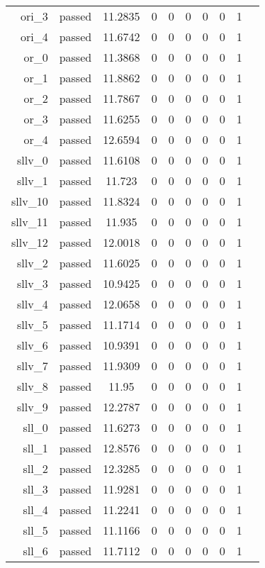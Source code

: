 \begin{longtable}{r|ccccccccc}
    ori\_3 & passed & 11.2835 & 0 & 0 & 0 & 0 & 0 & 1 \\
    ori\_4 & passed & 11.6742 & 0 & 0 & 0 & 0 & 0 & 1 \\
    or\_0 & passed & 11.3868 & 0 & 0 & 0 & 0 & 0 & 1 \\
    or\_1 & passed & 11.8862 & 0 & 0 & 0 & 0 & 0 & 1 \\
    or\_2 & passed & 11.7867 & 0 & 0 & 0 & 0 & 0 & 1 \\
    or\_3 & passed & 11.6255 & 0 & 0 & 0 & 0 & 0 & 1 \\
    or\_4 & passed & 12.6594 & 0 & 0 & 0 & 0 & 0 & 1 \\
    sllv\_0 & passed & 11.6108 & 0 & 0 & 0 & 0 & 0 & 1 \\
    sllv\_1 & passed & 11.723 & 0 & 0 & 0 & 0 & 0 & 1 \\
    sllv\_10 & passed & 11.8324 & 0 & 0 & 0 & 0 & 0 & 1 \\
    sllv\_11 & passed & 11.935 & 0 & 0 & 0 & 0 & 0 & 1 \\
    sllv\_12 & passed & 12.0018 & 0 & 0 & 0 & 0 & 0 & 1 \\
    sllv\_2 & passed & 11.6025 & 0 & 0 & 0 & 0 & 0 & 1 \\
    sllv\_3 & passed & 10.9425 & 0 & 0 & 0 & 0 & 0 & 1 \\
    sllv\_4 & passed & 12.0658 & 0 & 0 & 0 & 0 & 0 & 1 \\
    sllv\_5 & passed & 11.1714 & 0 & 0 & 0 & 0 & 0 & 1 \\
    sllv\_6 & passed & 10.9391 & 0 & 0 & 0 & 0 & 0 & 1 \\
    sllv\_7 & passed & 11.9309 & 0 & 0 & 0 & 0 & 0 & 1 \\
    sllv\_8 & passed & 11.95 & 0 & 0 & 0 & 0 & 0 & 1 \\
    sllv\_9 & passed & 12.2787 & 0 & 0 & 0 & 0 & 0 & 1 \\
    sll\_0 & passed & 11.6273 & 0 & 0 & 0 & 0 & 0 & 1 \\
    sll\_1 & passed & 12.8576 & 0 & 0 & 0 & 0 & 0 & 1 \\
    sll\_2 & passed & 12.3285 & 0 & 0 & 0 & 0 & 0 & 1 \\
    sll\_3 & passed & 11.9281 & 0 & 0 & 0 & 0 & 0 & 1 \\
    sll\_4 & passed & 11.2241 & 0 & 0 & 0 & 0 & 0 & 1 \\
    sll\_5 & passed & 11.1166 & 0 & 0 & 0 & 0 & 0 & 1 \\
    sll\_6 & passed & 11.7112 & 0 & 0 & 0 & 0 & 0 & 1 \\

\end{longtable}

